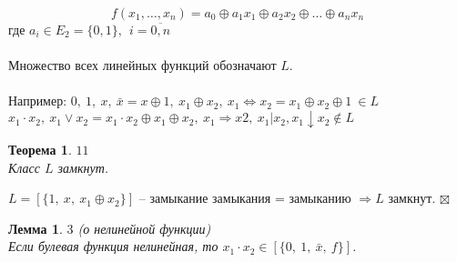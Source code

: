 \documentclass[a4paper, 12pt]{report}
\newenvironment{Proof} %
{\par\noindent{$\blacklozenge$}} %
{\hfill$\scriptstyle\boxtimes$} %
\newtheorem*{theorem}{Теорема} %
\newtheorem*{lemma}{Лемма} %
\begin{document}
	$$f(x_1,\dotso,x_n)=a_0 \oplus a_1x_1\oplus a_2x_2\oplus \dotso \oplus a_nx_n$$
 где $a_i \in E_2 = \{0, 1\},
 ~~ i= \overline{0, n}$\\\\
Множество всех линейных функций обозначают $L$.\\\\
Например: $0,~ 1,~ x,~ \bar x=x\oplus 1,~ x_1\oplus x_2,~ x_1\Leftrightarrow x_2 = x_1\oplus x_2\oplus 1 ~ \in L$\\
	     $ x_1\cdot x_2, ~ x_1\vee x_2 = x_1\cdot x_2 \oplus x_1 \oplus x_2,~ x_1\Rightarrow x2,~ x_1|x_2, x_1 \downarrow x_2 \notin L$\\
\begin{theorem} $11$\\
Класс $L$ замкнут.    
\end{theorem}
\begin{Proof}
    $L=[\{1,~ x,~ x_1\oplus x_2\}]$ – замыкание замыкания = замыканию $\Rightarrow L$ замкнут.
\end{Proof}
\begin{lemma} $3$ (о нелинейной функции)\\
    Если булевая функция нелинейная, то  $x_1\cdot x_2 \in [\{0,~ 1,~ \bar x,~ f\}]$.
\end{lemma}
\end{document}
